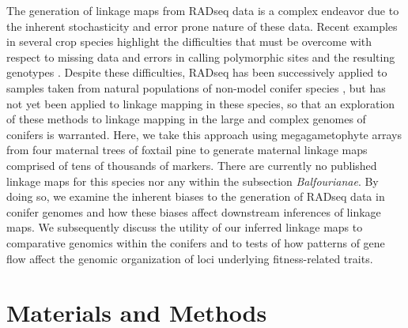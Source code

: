 \documentclass[11pt]{article}
\begin{document}
The generation of linkage maps from RADseq data is a complex endeavor due to the inherent stochasticity
and error prone nature of these data. Recent examples in several crop species highlight the
difficulties that must be overcome with respect to missing data and errors in calling polymorphic sites 
and the resulting genotypes \citep{Pfender:2011, Ward:2013}. Despite these difficulties, RADseq has been 
successively applied to samples taken from natural populations of non-model conifer species \citep{Parchman:2012}, but has not yet 
been applied to linkage mapping in these species, so that an exploration of these methods to linkage mapping in the large and complex 
genomes of conifers is warranted. Here, we take this approach using megagametophyte arrays from four maternal trees of foxtail pine
to generate maternal linkage maps comprised of tens of thousands of markers. There are currently no published linkage 
maps for this species nor any within the subsection \textit{Balfourianae}. By doing so, we examine the inherent biases
to the generation of RADseq data in conifer genomes and how these biases affect downstream inferences of linkage maps. We subsequently discuss
the utility of our inferred linkage maps to comparative genomics within the conifers and to tests of how patterns of gene flow 
affect the genomic organization of loci underlying fitness-related traits.


\section*{Materials and Methods}
\end{document}
